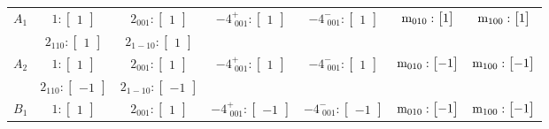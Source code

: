 \documentclass[fleqn,8pt,landscape]{jsarticle}
\begin{document}
\begin{longtable}{ccccccc}
$ A_{1} $ & $ 1:\begin{bmatrix} 1 \end{bmatrix} $ & $ 2{}_{001}:\begin{bmatrix} 1 \end{bmatrix} $ & $ -4^{+}_{\,\,001}:\begin{bmatrix} 1 \end{bmatrix} $ & $ -4^{-}_{\,\,001}:\begin{bmatrix} 1 \end{bmatrix} $ & $ {\rm m}_{010}:\begin{bmatrix} 1 \end{bmatrix} $ & $ {\rm m}_{100}:\begin{bmatrix} 1 \end{bmatrix} $ \\
& $ 2{}_{110}:\begin{bmatrix} 1 \end{bmatrix} $ & $ 2{}_{1-10}:\begin{bmatrix} 1 \end{bmatrix} $ & $  $ & $  $ & $  $ & $  $ \\ \hline
$ A_{2} $ & $ 1:\begin{bmatrix} 1 \end{bmatrix} $ & $ 2{}_{001}:\begin{bmatrix} 1 \end{bmatrix} $ & $ -4^{+}_{\,\,001}:\begin{bmatrix} 1 \end{bmatrix} $ & $ -4^{-}_{\,\,001}:\begin{bmatrix} 1 \end{bmatrix} $ & $ {\rm m}_{010}:\begin{bmatrix} -1 \end{bmatrix} $ & $ {\rm m}_{100}:\begin{bmatrix} -1 \end{bmatrix} $ \\
& $ 2{}_{110}:\begin{bmatrix} -1 \end{bmatrix} $ & $ 2{}_{1-10}:\begin{bmatrix} -1 \end{bmatrix} $ & $  $ & $  $ & $  $ & $  $ \\ \hline
$ B_{1} $ & $ 1:\begin{bmatrix} 1 \end{bmatrix} $ & $ 2{}_{001}:\begin{bmatrix} 1 \end{bmatrix} $ & $ -4^{+}_{\,\,001}:\begin{bmatrix} -1 \end{bmatrix} $ & $ -4^{-}_{\,\,001}:\begin{bmatrix} -1 \end{bmatrix} $ & $ {\rm m}_{010}:\begin{bmatrix} -1 \end{bmatrix} $ & $ {\rm m}_{100}:\begin{bmatrix} -1 \end{bmatrix} $ \\

\end{longtable}
\end{document}
